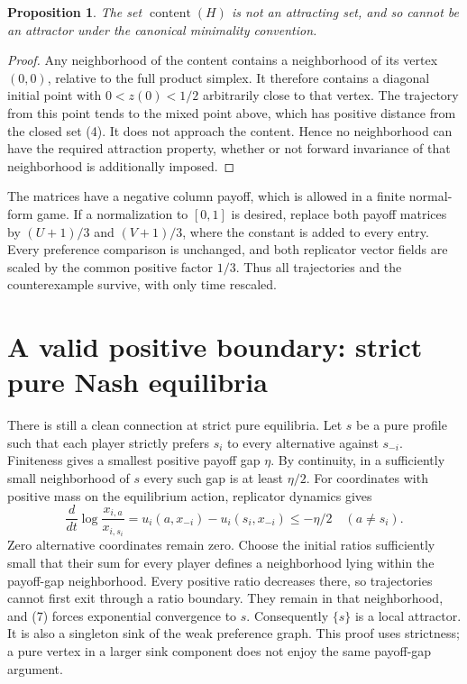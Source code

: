 \documentclass[11pt]{article}
\newtheorem{proposition}{Proposition}
\begin{document}
\begin{proposition}
The set $\operatorname{content}(H)$ is not an attracting set, and so
cannot be an attractor under the canonical minimality convention.
\end{proposition}
\begin{proof}
Any neighborhood of the content contains a neighborhood of its vertex
$(0,0)$, relative to the full product simplex. It therefore contains
a diagonal initial point with $0<z(0)<1/2$ arbitrarily close to that
vertex. The trajectory from this point tends to the mixed point above,
which has positive distance from the closed set (4). It does not
approach the content. Hence no neighborhood can have the required
attraction property, whether or not forward invariance of that
neighborhood is additionally imposed.
\end{proof}

The matrices have a negative column payoff, which is allowed in a
finite normal-form game. If a normalization to $[0,1]$ is desired,
replace both payoff matrices by $(U+1)/3$ and $(V+1)/3$, where the
constant is added to every entry. Every preference comparison is
unchanged, and both replicator vector fields are scaled by the common
positive factor $1/3$. Thus all trajectories and the counterexample
survive, with only time rescaled.

\section*{A valid positive boundary: strict pure Nash equilibria}
There is still a clean connection at strict pure equilibria. Let $s$
be a pure profile such that each player strictly prefers $s_i$ to every
alternative against $s_{-i}$. Finiteness gives a smallest positive
payoff gap $\eta$. By continuity, in a sufficiently small neighborhood
of $s$ every such gap is at least $\eta/2$. For coordinates with
positive mass on the equilibrium action, replicator dynamics gives
\[
 \frac{d}{dt}\log\frac{x_{i,a}}{x_{i,s_i}}
 =u_i(a,x_{-i})-u_i(s_i,x_{-i})\leq-\eta/2
 \quad(a\ne s_i).
 \tag{7}
\]
Zero alternative coordinates remain zero. Choose the initial ratios
sufficiently small that their sum for every player defines a
neighborhood lying within the payoff-gap neighborhood. Every positive
ratio decreases there, so trajectories cannot first exit through a
ratio boundary. They remain in that neighborhood, and (7) forces
exponential convergence to $s$. Consequently $\{s\}$ is a local
attractor. It is also a singleton sink of the weak preference graph.
This proof uses strictness; a pure vertex in a larger sink component
does not enjoy the same payoff-gap argument.
\end{document}
